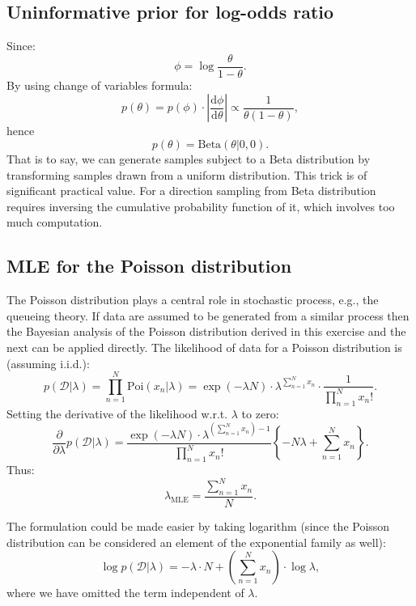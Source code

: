 \documentclass[UTF8]{ctexart}
\begin{document}
\subsection{Uninformative prior for log-odds ratio}
Since:
$$\phi=\log \frac{\theta}{1-\theta}.$$
By using change of variables formula:
$$p(\theta)=p(\phi)\cdot |\frac{\text{d}\phi}{\text{d}\theta}| \propto \frac{1}{\theta(1-\theta)},$$
hence
$$p(\theta)=\text{Beta}(\theta|0,0).$$
That is to say, we can generate samples subject to a Beta distribution by transforming samples drawn from a uniform distribution. 
This trick is of significant practical value. 
For a direction sampling from Beta distribution requires inversing the cumulative probability function of it, which involves too much computation. 

\subsection{MLE for the Poisson distribution}
The Poisson distribution plays a central role in stochastic process, e.g., the queueing theory. 
If data are assumed to be generated from a similar process then the Bayesian analysis of the Poisson distribution derived in this exercise and the next can be applied directly. 
The likelihood of data for a Poisson distribution is (assuming i.i.d.):
$$p(\mathcal{D}|\lambda)=\prod_{n=1}^{N}\text{Poi}(x_{n}|\lambda) = \exp(-\lambda N)\cdot \lambda^{\sum_{n=1}^{N}x_{n}}\cdot\frac{1}{\prod_{n=1}^{N}x_{n}!}.$$
Setting the derivative of the likelihood w.r.t. $\lambda$ to zero: 
$$\frac{\partial}{\partial \lambda}p(\mathcal{D}|\lambda) = \frac{\exp(-\lambda N)\cdot \lambda^{(\sum_{n=1}^{N} x_{n})- 1}}{\prod_{n=1}^{N}x_{n}!}\left\{ -N\lambda + \sum_{n=1}^{N}x_{n} \right\}.$$
Thus:
$$\lambda_{\text{MLE}} = \frac{\sum_{n=1}^{N}x_{n}}{N}.$$

The formulation could be made easier by taking logarithm (since the Poisson distribution can be considered an element of the exponential family as well):
$$\log p(\mathcal{D}|\lambda)=-\lambda\cdot N+\left(\sum_{n=1}^{N} x_{n}\right)\cdot \log \lambda,$$
where we have omitted the term independent of $\lambda$. 
\end{document}
